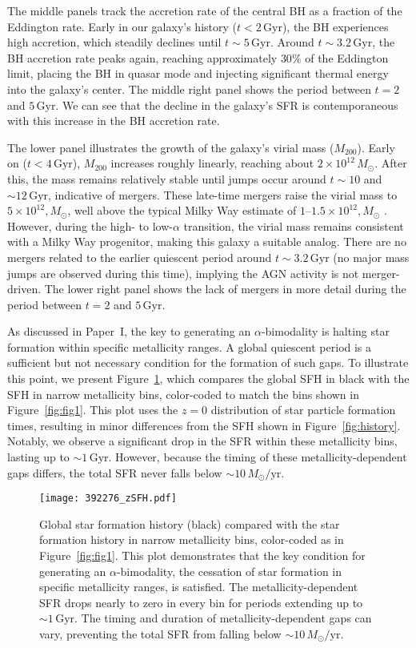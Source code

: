 \documentclass[twocolumn]{aastex631}
\newcommand{\Msun}{\ensuremath{M_{\odot}}}
\newcommand{\Gyr}{\ensuremath{\textrm{Gyr}}}
\newcommand{\Msunyr}{\ensuremath{\Msun/\textrm{yr}}}
\begin{document}
The middle panels track the accretion rate of the central BH as a fraction of the Eddington rate. Early in our galaxy's history ($t<2\,\Gyr$), the BH experiences high accretion, which steadily declines until $t\sim5\,\Gyr$. Around $t\sim3.2\,\Gyr$, the BH accretion rate peaks again, reaching approximately $30\%$ of the Eddington limit, placing the BH in quasar mode and injecting significant thermal energy into the galaxy's center. The middle right panel shows the period between $t=2$ and $5\,\Gyr$. We can see that the decline in the galaxy's SFR is contemporaneous with this increase in the BH accretion rate.

The lower panel illustrates the growth of the galaxy's virial mass ($M_{200}$). Early on ($t<4\,\Gyr$), $M_{200}$ increases roughly linearly, reaching about $2 \times 10^{12}\,\Msun$. After this, the mass remains relatively stable until jumps occur around $t\sim10$ and $\sim12\,\Gyr$, indicative of mergers. These late-time mergers raise the virial mass to $5 \times 10^{12},\Msun$, well above the typical Milky Way estimate of $1$--$1.5\times 10^{12},\Msun$ \citep[e.g.][]{2016ARA&A..54..529B}. However, during the high- to low-$\alpha$ transition, the virial mass remains consistent with a Milky Way progenitor, making this galaxy a suitable analog. There are no mergers related to the earlier quiescent period around $t\sim3.2\,\Gyr$ (no major mass jumps are observed during this time), implying the AGN activity is not merger-driven. The lower right panel shows the lack of mergers in more detail during the period between $t=2$ and $5\,\Gyr$.

As discussed in Paper~I, the key to generating an $\alpha$-bimodality is halting star formation within specific metallicity ranges. A global quiescent period is a sufficient but not necessary condition for the formation of such gaps. To illustrate this point, we present Figure~\ref{fig:zSFH}, which compares the global SFH in black with the SFH in narrow metallicity bins, color-coded to match the bins shown in Figure~\ref{fig:fig1}. This plot uses the $z=0$ distribution of star particle formation times, resulting in minor differences from the SFH shown in Figure~\ref{fig:history}. Notably, we observe a significant drop in the SFR within these metallicity bins, lasting up to $\sim1\,\Gyr$. However, because the timing of these metallicity-dependent gaps differs, the total SFR never falls below $\sim10\,\Msunyr$.

\begin{figure}
  \centering
  \texttt{[image: 392276\_zSFH.pdf]}
  \caption{Global star formation history (black) compared with the star formation history in narrow metallicity bins, color-coded as in Figure~\ref{fig:fig1}. This plot demonstrates that the key condition for generating an $\alpha$-bimodality, the cessation of star formation in specific metallicity ranges, is satisfied. The metallicity-dependent SFR drops nearly to zero in every bin for periods extending up to $\sim1\,\Gyr$. The timing and duration of metallicity-dependent gaps can vary, preventing the total SFR from falling below $\sim10\,\Msunyr$.}
  \label{fig:zSFH}
\end{figure}
\end{document}
